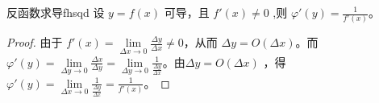     \begin{theorem}{反函数求导}{fhsqd}
        设 $ y = f(x) $ 可导，且 $f'(x) \neq 0$ ,则 $ \varphi'(y) = \displaystyle\frac{1}{f'(x)} $。
    \end{theorem}

    \begin{proof}
        由于 $ f'(x) = \lim\limits_{\Delta x \to 0} \displaystyle\frac{\Delta y}{\Delta x} \neq 0 $，从而 $\Delta y = O(\Delta x)$。而 $ \varphi'(y) = \lim\limits_{\Delta y \to 0} \displaystyle\frac{\Delta x}{\Delta y} = \lim\limits_{\Delta y \to 0} \displaystyle\frac{1}{\frac{\Delta y}{\Delta x}}$。由$\Delta y = O(\Delta x)$ ，得$ \varphi'(y) =\lim\limits_{\Delta x \to 0} \displaystyle\frac{1}{\frac{\Delta y}{\Delta x}} = \displaystyle\frac{1}{f'(x)}$。
    \end{proof}
 
